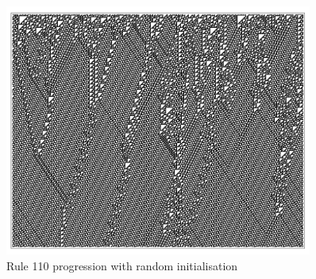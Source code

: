 \begin{figure}[!h]
\centering
\includegraphics[width=0.9\textwidth]{images/rule-110.png}
\caption{Rule 110 progression with random initialisation \cite{wolfram2002}}
\label{fig:rule-110}
\end{figure}


\raggedbottom
\pagebreak
